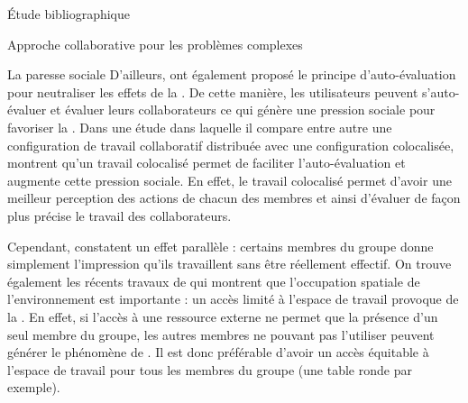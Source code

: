 \documentclass[myfrancais,ngerman,english,frenchb]{mythesis}
\begin{document}
\begin{mychapter}{Étude bibliographique}
\begin{mysection}{Approche collaborative pour les problèmes complexes}
\begin{mysubsection}{La paresse sociale}
				D'ailleurs,  ont également proposé le principe d'auto-évaluation pour neutraliser les effets de la .
				De cette manière, les utilisateurs peuvent s'auto-évaluer et évaluer leurs collaborateurs ce qui génère une pression sociale pour favoriser la  .
				Dans une étude dans laquelle il compare entre autre une configuration de travail collaboratif distribuée avec une configuration colocalisée,  montrent qu'un travail colocalisé permet de faciliter l'auto-évaluation et augmente cette pression sociale.
				En effet, le travail colocalisé permet d'avoir une meilleur perception des actions de chacun des membres et ainsi d'évaluer de façon plus précise le travail des collaborateurs.

				Cependant,  constatent un effet parallèle : certains membres du groupe donne simplement l'impression qu'ils travaillent sans être réellement effectif.
				On trouve également les récents travaux de  qui montrent que l'occupation spatiale de l'environnement est importante : un accès limité à l'espace de travail provoque de la .
				En effet, si l'accès à une ressource externe ne permet que la présence d'un seul membre du groupe, les autres membres ne pouvant pas l'utiliser peuvent générer le phénomène de .
				Il est donc préférable d'avoir un accès équitable à l'espace de travail pour tous les membres du groupe (une table ronde par exemple).


\end{mysubsection}
\end{mysection}
\end{mychapter}
\end{document}
